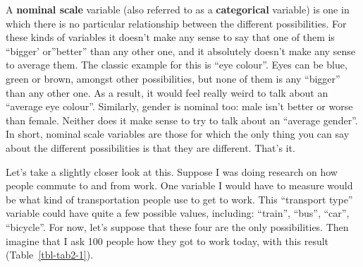 \documentclass[
  letterpaper,
]{book}
\begin{document}
A \textbf{nominal scale} variable (also referred to as a
\textbf{categorical} variable) is one in which there is no particular
relationship between the different possibilities. For these kinds of
variables it doesn't make any sense to say that one of them is ``bigger'
or''better'' than any other one, and it absolutely doesn't make any
sense to average them. The classic example for this is ``eye colour''.
Eyes can be blue, green or brown, amongst other possibilities, but none
of them is any ``bigger'' than any other one. As a result, it would feel
really weird to talk about an ``average eye colour''. Similarly, gender
is nominal too: male isn't better or worse than female. Neither does it
make sense to try to talk about an ``average gender''. In short, nominal
scale variables are those for which the only thing you can say about the
different possibilities is that they are different. That's it.

Let's take a slightly closer look at this. Suppose I was doing research
on how people commute to and from work. One variable I would have to
measure would be what kind of transportation people use to get to work.
This ``transport type'' variable could have quite a few possible values,
including: ``train'', ``bus'', ``car'', ``bicycle''. For now, let's
suppose that these four are the only possibilities. Then imagine that I
ask 100 people how they got to work today, with this result
(Table~\ref{tbl-tab2-1}).

\hypertarget{tbl-tab2-1}{}
 
  \providecommand{\huxb}[2]{\arrayrulecolor[RGB]{#1}\global\arrayrulewidth=#2pt}
  \providecommand{\huxvb}[2]{\color[RGB]{#1}\vrule width #2pt}
  \providecommand{\huxtpad}[1]{\rule{0pt}{#1}}
  \providecommand{\huxbpad}[1]{\rule[-#1]{0pt}{#1}}
\end{document}
